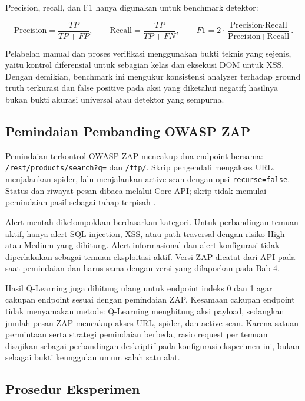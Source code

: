 Precision, recall, dan F1 hanya digunakan untuk benchmark detektor:

\begin{equation}
\text{Precision} = \frac{TP}{TP+FP}, \qquad
\text{Recall} = \frac{TP}{TP+FN}, \qquad
F1 = 2 \cdot \frac{\text{Precision}\cdot\text{Recall}}
{\text{Precision}+\text{Recall}}.
\end{equation}

Pelabelan manual dan proses verifikasi menggunakan bukti teknis yang sejenis, yaitu kontrol diferensial untuk sebagian kelas dan eksekusi DOM untuk XSS. Dengan demikian, benchmark ini mengukur konsistensi analyzer terhadap ground truth terkurasi dan false positive pada aksi yang diketahui negatif; hasilnya bukan bukti akurasi universal atau detektor yang sempurna.

\subsection{Pemindaian Pembanding OWASP ZAP}

Pemindaian terkontrol OWASP ZAP mencakup dua endpoint bersama: \texttt{/rest/products/search?q=} dan \texttt{/ftp/}. Skrip pengendali mengakses URL, menjalankan spider, lalu menjalankan active scan dengan opsi \texttt{recurse=false}. Status dan riwayat pesan dibaca melalui Core API; skrip tidak memulai pemindaian pasif sebagai tahap terpisah \cite{owaspZapApi}.

Alert mentah dikelompokkan berdasarkan kategori. Untuk perbandingan temuan aktif, hanya alert SQL injection, XSS, atau path traversal dengan risiko High atau Medium yang dihitung. Alert informasional dan alert konfigurasi tidak diperlakukan sebagai temuan eksploitasi aktif. Versi ZAP dicatat dari API pada saat pemindaian dan harus sama dengan versi yang dilaporkan pada Bab 4.

Hasil Q-Learning juga dihitung ulang untuk endpoint indeks 0 dan 1 agar cakupan endpoint sesuai dengan pemindaian ZAP. Kesamaan cakupan endpoint tidak menyamakan metode: Q-Learning menghitung aksi payload, sedangkan jumlah pesan ZAP mencakup akses URL, spider, dan active scan. Karena satuan permintaan serta strategi pemindaian berbeda, rasio request per temuan disajikan sebagai perbandingan deskriptif pada konfigurasi eksperimen ini, bukan sebagai bukti keunggulan umum salah satu alat.

\subsection{Prosedur Eksperimen}

